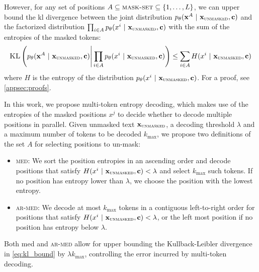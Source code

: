 However, for any set of positions $A \subseteq \textsc{mask-set} \subseteq \{1, \dots, L\}$, we can upper bound the \gls{kl} divergence between the joint distribution $p_\theta(\mathbf{x}^{A} ~\vert~ \mathbf{x}_\textsc{unmasked}, \mathbf{c})$ and the factorized distribution $\prod_{i\in A} p_\theta( x^i ~\vert~ \mathbf{x}_\textsc{unmasked}, \mathbf{c})$ with the sum of the entropies of the masked tokens: 
\begin{align}\label{eq:kl_bound}
    \textsc{KL}\left(p_\theta(\mathbf{x}^{A} ~\vert~ \mathbf{x}_\textsc{unmasked}, \mathbf{c}) \Bigg| \prod_{i\in A} p_\theta( x^i ~\vert~ \mathbf{x}_\textsc{unmasked}, \mathbf{c})\right) 
    \leq \sum_{i \in A} H(x^i ~\vert~ \mathbf{x}_\textsc{unmasked}, \mathbf{c})
\end{align}
where $H$ is the entropy of the distribution $p_\theta(x^i ~\vert~  \mathbf{x}_\textsc{unmasked}, \mathbf{c})$. For a proof, see \cref{appsec:proofs}.

In this work, we propose multi-token entropy decoding, which makes use of the entropies of the masked positions $x^j$ to decide whether to decode multiple positions in parallel. Given unmasked text $\mathbf{x}_{\textsc{unmasked}}$, a decoding threshold $\lambda$ and a maximum number of tokens to be decoded $k_\text{max}$, we propose two definitions of the set $A$ for selecting positions to un-mask: 
\begin{itemize}[leftmargin=*]
    \item \textsc{med}: We sort the position entropies in an ascending order and decode positions that satisfy $H(x^i ~\vert~ \mathbf{x}_\textsc{unmasked}, \mathbf{c}) < \lambda$  and select $k_\text{max}$ such tokens. If no position has entropy lower than $\lambda$, we choose the position with the lowest entropy.     
    \item \textsc{ar-med}: We decode at most $k_\text{max}$ tokens in a contiguous left-to-right order for positions that satisfy $H(x^i ~\vert~ \mathbf{x}_\textsc{unmasked}, \mathbf{c}) < \lambda$, or the left most position if no position has entropy below $\lambda$. 
\end{itemize}
Both \gls{med} and \textsc{ar-med} allow for upper bounding the Kullback-Leibler divergence in \cref{eq:kl_bound} by $\lambda k_\text{max}$, controlling the error incurred by multi-token decoding.
